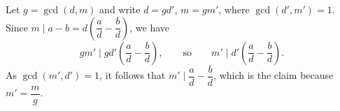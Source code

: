 Let $g=\gcd(d,m)$ and write $d=gd'$, $m=gm'$, where $\gcd(d',m')=1$. Since $m\mid a-b=d\left(\dfrac {a}{d}-\dfrac {b}{d}\right)$, we have
\[gm'\mid gd'\left(\dfrac {a}{d}-\dfrac {b}{d}\right),\qquad\text{so}\qquad m'\mid d'\left(\dfrac {a}{d}-\dfrac {b}{d}\right).\]
As $\gcd(m',d')=1$, it follows that $m'\mid\dfrac {a}{d}-\dfrac {b}{d}$, which is the claim because $m'=\dfrac {m}{g}$.
